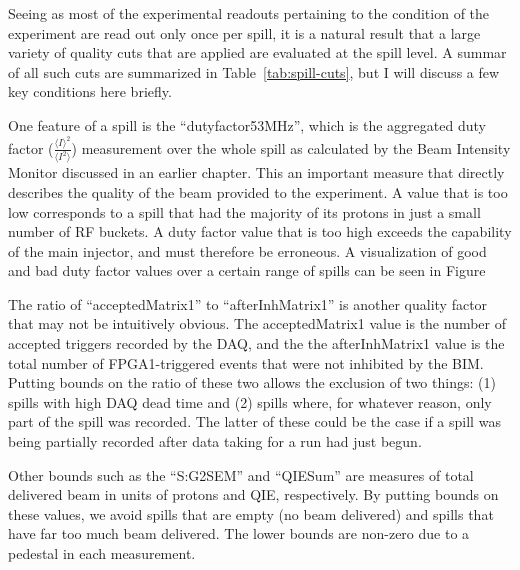 Seeing as most of the experimental readouts pertaining to the condition of the experiment are read out only once per spill, it is a natural result that a large variety of quality cuts that are applied are evaluated at the spill level. A summar of all such cuts are summarized in Table~\ref{tab:spill-cuts}, but I will discuss a few key conditions here briefly.

One feature of a spill is the ``dutyfactor53MHz'', which is the aggregated duty factor ($\frac{\langle I\rangle^{2}}{\langle I^{2}\rangle}$) measurement over the whole spill as calculated by the Beam Intensity Monitor discussed in an earlier chapter. This an important measure that directly describes the quality of the beam provided to the experiment. A value that is too low corresponds to a spill that had the majority of its protons in just a small number of RF buckets. A duty factor value that is too high exceeds the capability of the main injector, and must therefore be erroneous. A visualization of good and bad duty factor values over a certain range of spills can be seen in Figure%


The ratio of ``acceptedMatrix1'' to ``afterInhMatrix1'' is another quality factor that may not be intuitively obvious. The acceptedMatrix1 value is the number of accepted triggers recorded by the DAQ, and the the afterInhMatrix1 value is the total number of FPGA1-triggered events that were not inhibited by the BIM. Putting bounds on the ratio of these two allows the exclusion of two things: (1) spills with high DAQ dead time and (2) spills where, for whatever reason, only part of the spill was recorded. The latter of these could be the case if a spill was being partially recorded after data taking for a run had just begun.


Other bounds such as the ``S:G2SEM'' and ``QIESum'' are measures of total delivered beam in units of protons and QIE, respectively. By putting bounds on these values, we avoid spills that are empty (no beam delivered) and spills that have far too much beam delivered. The lower bounds are non-zero due to a pedestal in each measurement.


